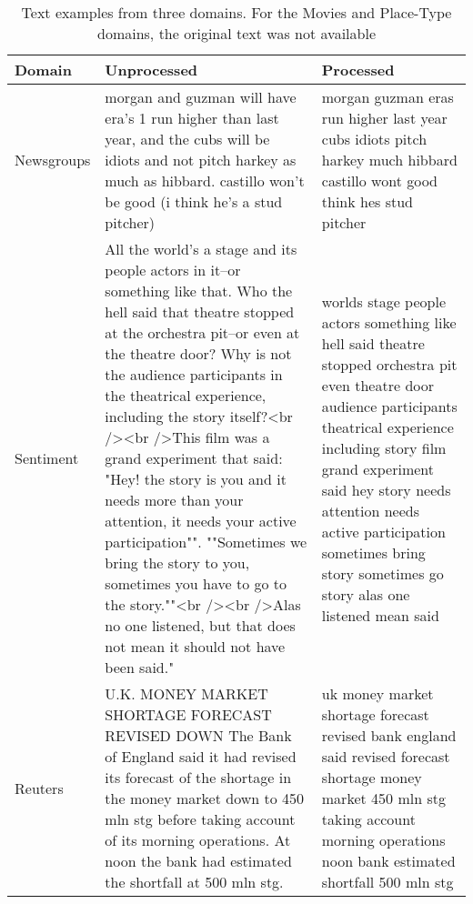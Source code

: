 \begin{table}[] 
	\scriptsize
	\begin{tabular}{lp{6.75cm}p{6.75cm}}
		Domain  & Unprocessed                                                                                                                                                                                                                                                                                                                                                                               & Processed       \\
		\midrule[\heavyrulewidth]
		Newsgroups & morgan and guzman will have era's 1 run higher than last year, and  the cubs will be idiots and not pitch harkey as much as hibbard.  castillo won't be good (i think he's a stud pitcher)                                                                                                                                                                                                & morgan guzman eras run higher last year cubs idiots pitch harkey much hibbard castillo wont good think hes stud pitcher                            \\
		Sentiment  & All the world's a stage and its people actors in it--or something like that. Who the hell said that theatre stopped at the orchestra pit--or even at the theatre door? 
		Why is not the audience participants in the theatrical experience, including the story itself?<br /><br />This film was a grand experiment that said: "Hey! the story is you and it 
		needs more than your attention, it needs your active participation"". ""Sometimes we bring the story to you, sometimes you have to go to the story.""<br /><br />Alas no one listened, 
		but that does not mean it should not have been said." & worlds stage people actors something like hell said theatre stopped orchestra pit even theatre door audience participants
		theatrical experience including  story film grand experiment said hey story needs attention needs active participation sometimes bring story sometimes go story alas one listened mean
		said \\
		Reuters    & U.K. MONEY MARKET SHORTAGE FORECAST REVISED DOWN The Bank of England said it had revised its forecast of the shortage in the money market down to 450 mln stg before taking account of its morning operations. At noon the bank had estimated the shortfall at 500 mln stg.                                                                                                               & uk money market shortage forecast revised bank england said revised forecast shortage money market 450 mln stg taking account morning operations noon bank estimated shortfall 500 mln stg     \\
	\end{tabular}
	\caption{Text examples from three domains. For the Movies and Place-Type domains, the original text was not available}\label{ch3:TextExamples}
\end{table}



